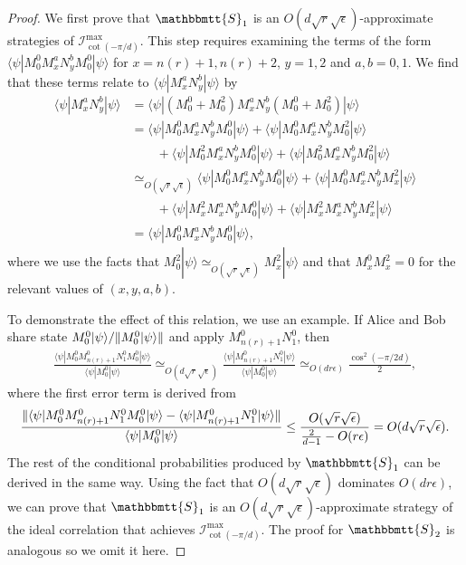 \documentclass[11pt,letterpaper]{article}
\newcommand{\ket}[1]{|#1\rangle}
\newcommand{\bra}[1]{\langle#1|}
\DeclarePairedDelimiter{\norm}{\lVert}{\rVert}
\newcommand{\1}{\mathbb{1}}
\newcommand{\nr}{n(r)}
\newcommand{\bS}{\mathbbmtt{S}}
\newcommand{\I}{\mathcal{I}}
\newcommand{\ep}{\epsilon}
\newcommand{\se}{\sqrt{\epsilon}}
\newcommand{\sr}{\sqrt{r}}
\newcommand{\appd}[1]{\simeq_{#1}}
\theoremstyle{definition}
\begin{document}
\begin{proof}
We first prove that $\bS_1$ is an 
$O(d \sr \se)$-approximate strategies of $\I_{\cot(-\pi/d)}^{\max}$.
This step requires examining the terms of the form
$\bra{\psi} M_0^0 M_{x}^a N_y^b M_0^0\ket{\psi}$ for $x = \nr+1,\nr+2$, $y=1,2$ and $a,b = 0,1$.
We find that these terms relate to $\bra{\psi} M_x^a N_y^b \ket{\psi}$ by
\begin{align*}
	   \bra{\psi} M_{x}^aN_y^b \ket{\psi} 
	&= \bra{\psi}(M_0^0 + M_0^2) M_x^a N_y^b (M_0^0 + M_0^2)\ket{\psi} \\
	&=  \bra{\psi}M_0^0 M_x^aN_y^b M_0^0\ket{\psi} + \bra{\psi}M_0^0 M_x^aN_y^b M_0^2\ket{\psi}\\
	&\quad\quad+\bra{\psi}M_0^2 M_x^aN_y^b M_0^0\ket{\psi} + \bra{\psi}M_0^2 M_x^aN_y^b M_0^2\ket{\psi}\\
	&\appd{O(\sr\se)}  \bra{\psi}M_0^0 M_x^aN_y^b M_0^0\ket{\psi} + \bra{\psi}M_0^0 M_x^aN_y^b M_x^2\ket{\psi} \\
	&\quad \quad +\bra{\psi}M_x^2 M_x^aN_y^b M_0^0\ket{\psi} + \bra{\psi}M_x^2 M_x^aN_y^b M_x^2\ket{\psi}\\
	&=\bra{\psi}M_0^0 M_x^aN_y^b M_0^0\ket{\psi},
\end{align*}
where we use the facts that $M_0^2 \ket{\psi} \appd{O(\sr \se)} M_x^2 \ket{\psi}$ and that 
$M_x^0 M_x^2 = 0$ for the relevant values of $(x,y,a,b)$.

To demonstrate the effect of this relation, we use an example.
If Alice and Bob share state $M_0^0 \ket{\psi}/\norm{M_0^0 \ket{\psi}}$ and apply $M_{\nr+1}^0N_1^0$,
then
\begin{align*}
	\frac{\bra{\psi}M_0^0 M_{\nr+1}^0N_1^0 M_0^0\ket{\psi}}{\bra{\psi} M_0^0 \ket{\psi}}  
	\appd{O(d \sr \se)} \frac{\bra{\psi} M_{\nr+1}^0N_1^0 \ket{\psi}}{\bra{\psi} M_0^0 \ket{\psi}}
	\appd{O(d r \ep)}
	\frac{\cos^2(-\pi/2d)}{2},
\end{align*} 
where the first error term is derived from
\begin{align*}
	\frac{ \norm{\bra{\psi}M_0^0 M_{\nr+1}^0N_1^0 M_0^0\ket{\psi} -  \bra{\psi} M_{\nr+1}^0N_1^0 \ket{\psi}}}
	{\bra{\psi} M_0^0 \ket{\psi}} \leq \frac{O(\sr\se)}{\frac{2}{d-1} - O(r \ep)} = O(d \sr \se).
\end{align*}
The rest of the conditional probabilities produced by $\bS_1$ can be derived in the same way.
Using the fact that $O(d \sr \se)$ dominates $O(d r \ep)$,
we can prove that $\bS_1$ is an $O(d \sr\se)$-approximate strategy of the ideal correlation that achieves $\I_{\cot(-\pi/d)}^{\max}$.
The proof for $\bS_2$ is analogous so we omit it here.
\end{proof}
\end{document}
